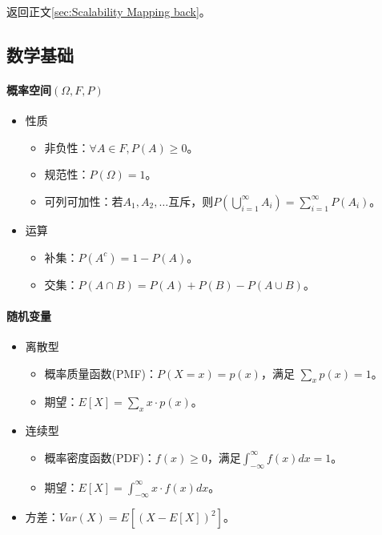 \documentclass[
12pt, %
a4paper, 
oneside, %
headinclude,footinclude, %
]{scrartcl}
\begin{document}
返回正文\ref{sec:Scalability Mapping back}。
\subsection{数学基础}
\paragraph*{概率空间$ (\Omega, F, P) $}
\begin{itemize}
\item 性质
\begin{itemize}
\item 非负性：$ \forall A \in F,P(A) \geq 0 $。
\item 规范性：$ P(\Omega) = 1 $。
\item 可列可加性：若$ A_1, A_2, \dots $互斥，则$ P(\bigcup_{i = 1}^{\infty} A_i) = \sum_{i = 1}^{\infty} P(A_i) $。
\end{itemize}
\item 运算
\begin{itemize}
\item 补集：$ P(A^c) = 1 - P(A) $。
\item 交集：$ P(A \cap B) = P(A) + P(B) - P(A \cup B) $。
\end{itemize}
\end{itemize}
\paragraph*{随机变量}
\begin{itemize}
\item 离散型
\begin{itemize}
\item 概率质量函数(PMF)：$ P(X = x) = p(x) $，满足 $ \sum_{x} p(x) = 1 $。
\item 期望：$ E[X] = \sum_{x} x \cdot p(x) $。
\end{itemize}
\item 连续型
\begin{itemize}
\item 概率密度函数(PDF)：$ f(x) \geq 0 $，满足$ \int_{-\infty}^{\infty} f(x) dx = 1 $。
\item 期望：$ E[X] = \int_{-\infty}^{\infty} x \cdot f(x) dx $。
\end{itemize}
\item 方差：$ Var(X) = E[(X - E[X])^2] $。
\end{itemize}
\end{document}
